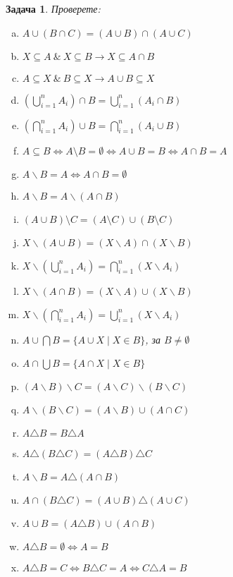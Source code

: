 \documentclass[a4paper]{article}
\newtheorem{problem}{Задача}
\begin{document}
\begin{problem}
  Проверете:
\begin{enumerate}[a)]
  \item
    $A\cup(B\cap C) = (A\cup B)\cap(A\cup C)$
  \item
    $X\subseteq A\ \&\ X\subseteq B \rightarrow X\subseteq A\cap B$
  \item
    $A\subseteq X\ \&\ B\subseteq X \rightarrow A\cup B\subseteq X$
  \item
    $(\bigcup^{n}_{i=1} A_i) \cap B = \bigcup^{n}_{i=1} (A_i \cap B)$
  \item
    $(\bigcap^{n}_{i=1} A_i) \cup B = \bigcap^{n}_{i=1} (A_i \cup B)$
  \item
    $A\subseteq B \iff A\setminus B = \emptyset \iff A\cup B = B \iff A\cap B = A$
  \item
    $A\backslash B = A \iff A\cap B = \emptyset$
  \item
    $A\backslash B = A\backslash (A\cap B)$
  \item
    $(A\cup B)\setminus C = (A\setminus C) \cup (B\setminus C)$
  \item
    $X\backslash (A\cup B) = (X\backslash A)\cap(X\backslash B)$
  \item
    $X\backslash(\bigcup^{n}_{i=1} A_i) = \bigcap^{n}_{i=1} (X\backslash A_i)$
  \item
    $X\backslash (A\cap B) = (X\backslash A)\cup(X\backslash B)$
  \item
    $X\backslash(\bigcap^{n}_{i=1} A_i) = \bigcup^{n}_{i=1} (X\backslash A_i)$
  \item
    $A\cup\bigcap B = \{A\cup X\mid X\in B\}$, за $B\neq\emptyset$
  \item
    $A\cap\bigcup B = \{A\cap X\mid X\in B\}$
  \item
    $(A\backslash B)\backslash C = (A\backslash C)\backslash(B \backslash C)$
  \item
    $A\backslash (B\backslash C) = (A\backslash B) \cup (A\cap C)$
  \item
    $A\triangle B = B\triangle A$
  \item
    $A\triangle(B\triangle C) = (A\triangle B)\triangle C$
  \item
    $A\backslash B = A\triangle(A\cap B)$
  \item
    $A\cap(B\triangle C) = (A\cup B)\triangle(A\cup C)$
  \item
    $A\cup B = (A\triangle B)\cup(A\cap B)$
  \item
    $A\triangle B = \emptyset \iff A = B$
  \item
    $A\triangle B = C \iff B\triangle C = A \iff C\triangle A = B$
  \end{enumerate}
\end{problem}
\end{document}

